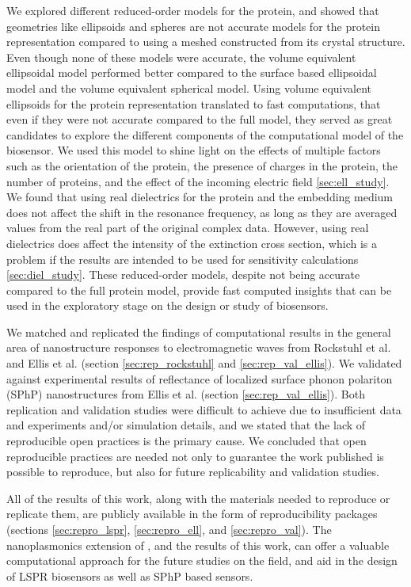We explored different reduced-order models for the protein, and showed that geometries like ellipsoids and spheres
are not accurate models for the protein representation compared to using a meshed constructed from its crystal structure. Even though
none of these models were accurate, the volume equivalent ellipsoidal model performed better compared to the surface based ellipsoidal 
model and the volume equivalent spherical model. Using volume equivalent ellipsoids for the protein representation 
translated to fast computations, that even if they were not accurate compared to the full model, they served as great candidates to
explore the different components of the computational model of the biosensor. We used this model to shine light on the effects of multiple factors such as 
the orientation of the protein, the presence of charges in the protein, the number of proteins, and the effect of the incoming electric field \ref{sec:ell_study}.
We found that using real dielectrics for the protein and the embedding medium does not affect the shift in the resonance frequency, 
as long as they are averaged values from the real part of the original complex data. However, using real dielectrics does affect the 
intensity of the extinction cross section, which is a problem if the results are intended to be used for sensitivity calculations \ref{sec:diel_study}. 
These reduced-order models, despite not being accurate compared to the full protein model, provide fast computed insights that can be used 
in the exploratory stage on the design or study of biosensors.

We matched and replicated the findings of computational results in the general area of nanostructure responses to electromagnetic waves 
from Rockstuhl et al. \cite{rockstuhl2005} and Ellis et al.\cite{ellis2016} (section \ref{sec:rep_rockstuhl} and \ref{sec:rep_val_ellis}). We validated
\pygbe against experimental results of reflectance of localized surface phonon polariton (SPhP) nanostructures from Ellis et 
al. (section \ref{sec:rep_val_ellis}). Both replication and validation studies were difficult to achieve due to insufficient data and experiments 
and/or simulation details, and we stated that the lack of reproducible open practices is the primary cause. We concluded that open reproducible 
practices are needed not only to guarantee the work published is possible to reproduce, but also for future replicability and validation studies. 

All of the results of this work, along with the materials needed to reproduce or replicate them, are publicly available in the form of 
reproducibility packages (sections \ref{sec:repro_lspr}, \ref{sec:repro_ell}, and \ref{sec:repro_val}). The nanoplasmonics extension of \pygbe, and 
the results of this work, can offer a valuable computational approach for the future studies on the field, and aid in the design of LSPR biosensors 
as well as SPhP based sensors. 


